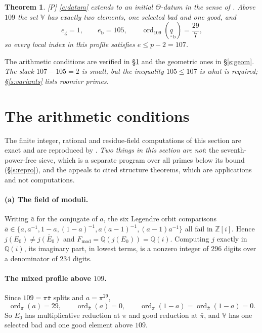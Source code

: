\documentclass[11pt]{article}
\theoremstyle{plain}
\newtheorem{theorem}{Theorem}
\theoremstyle{definition}
\newcommand{\Fmod}{F_{\mathrm{mod}}}
\newcommand{\VV}{\mathbb{V}}
\newcommand{\ord}{\operatorname{ord}}
\begin{document}
\begin{theorem}\label{t:datum}
\textup{[P]} \eqref{e:datum} extends to an initial $\Theta$-datum in the sense of
\cite[Def.~3.1]{IUT1}.  Above $109$ the set $\VV$ has exactly two elements, one
selected bad and one good, and
\[
 e_{\mathrm g}=1,\qquad e_{\mathrm b}=105,\qquad
 \ord_{109}(\underline{\underline q}_{\mathrm b})=\frac{29}{7},
\]
so every local index in this profile satisfies $e\le p-2=107$.
\end{theorem}

The arithmetic conditions are verified in \S\ref{s:arith} and the geometric ones in
\S\ref{s:geom}.  \emph{The slack $107-105=2$ is small, but the inequality $105\le107$ is what is
required; \S\ref{s:variants} lists roomier primes.}

\section{The arithmetic conditions}\label{s:arith}

The finite integer, rational and residue-field computations of this section are exact
and are reproduced by .  \emph{Two things in this section
are not}: the seventh-power-free sieve, which is a separate program over all primes
below its bound (\S\ref{s:repro}), and the appeals to cited structure theorems, which
are applications and not computations.

\paragraph{(a) The field of moduli.}
Writing $\bar a$ for the conjugate of $a$, the six Legendre orbit comparisons
$\bar a\in\{a,a^{-1},1-a,(1-a)^{-1},a(a-1)^{-1},(a-1)a^{-1}\}$ all fail in
$\mathbb{Z}[i]$.  Hence $j(E_0)\ne\overline{j(E_0)}$ and
$\Fmod=\mathbb{Q}(j(E_0))=\mathbb{Q}(i)$.  Computing $j$ exactly in
$\mathbb{Q}(i)$, its imaginary part, in lowest terms, is a nonzero
integer of $296$ digits over a denominator of $234$ digits.

\paragraph{The mixed profile above $109$.}
Since $109=\pi\bar\pi$ splits and $a=\pi^{29}$,
\[
 \ord_\pi(a)=29,\qquad \ord_{\bar\pi}(a)=0,\qquad
 \ord_\pi(1-a)=\ord_{\bar\pi}(1-a)=0 .
\]
So $E_0$ has multiplicative reduction at $\pi$ and good reduction at $\bar\pi$, and
$\VV$ has one selected bad and one good element above $109$.
\end{document}
